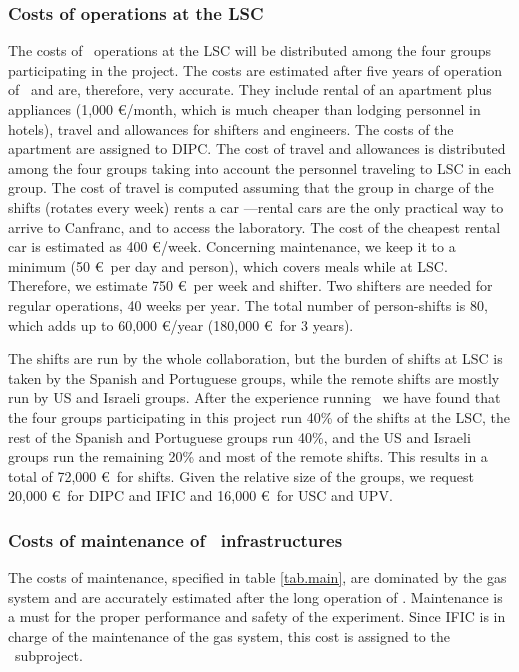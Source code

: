 \subsubsection{Costs of operations at the LSC}
\label{sec:operationcost}
The costs of \Next\ operations at the LSC will be distributed among the four groups participating in the project. The costs are estimated after five years of operation of \New\ and are, therefore, very accurate. They include rental of an apartment plus appliances (1,000 \euro/month, which is much cheaper than lodging personnel in hotels), travel and allowances for shifters and engineers.  The costs of the apartment are assigned to DIPC. The cost of travel and allowances is distributed among the four groups taking into account the personnel traveling to LSC in each group. The cost of travel is computed assuming that the group in charge of the shifts (rotates every week) rents a car ---rental cars are the only practical way to arrive to Canfranc, and to access the laboratory. The cost of the cheapest rental car is estimated as 400 \euro/week. Concerning maintenance, we keep it to a minimum (50 \euro\ per day and person), which covers meals while at LSC. Therefore, we estimate 750 \euro\ per week and shifter. Two shifters are needed for regular operations, 40 weeks per year. The total number of person-shifts is 80, which adds up to 60,000 \euro/year (180,000 \euro\ for 3 years).

The shifts are run by the whole collaboration, but the burden of shifts at LSC is taken by the Spanish and Portuguese groups, while the remote shifts are mostly run by US and Israeli groups. After the experience running \NEW\, we have found that the four groups participating in this project run 40\% of the shifts at the LSC, the rest of the Spanish and Portuguese groups run 40\%, and the US and Israeli groups run the remaining 20\% and most of the remote shifts. This results in a total of 
72,000 \euro\ for shifts. Given the relative size of the groups, we request 20,000 \euro\ for DIPC and IFIC and 16,000 \euro\ for USC and UPV.

\subsubsection{Costs of maintenance of \Next\ infrastructures}

The costs of maintenance, specified in table \ref{tab.main}, are dominated by the gas system and are accurately estimated after the long operation of \NEW. Maintenance is a must for the proper performance and safety of the experiment. Since IFIC is in charge of the maintenance of the gas system, this cost is assigned to the \sIFIC\ subproject.


